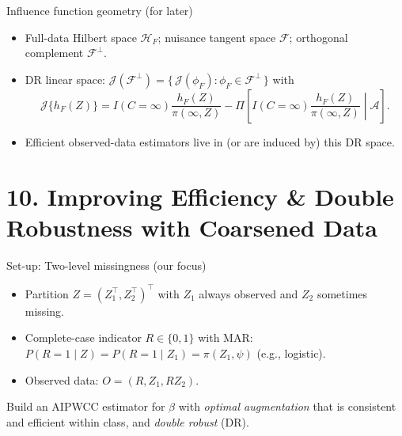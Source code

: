 \documentclass[xcolor=dvipsnames,aspectratio=169]{beamer}
\newcommand{\1}{\mathbbm{1}}
\begin{document}
\begin{frame}{Influence function geometry (for later)}
  \begin{itemize}
    \item Full-data Hilbert space $\mathcal{H}_F$; nuisance tangent space $\mathcal{F}$; orthogonal complement $\mathcal{F}^{\perp}$.
    \item DR linear space: $\mathcal{J}(\mathcal{F}^{\perp})=\{\,\mathcal{J}(\phi_F): \phi_F\in\mathcal{F}^{\perp}\,\}$ with
    \[
      \mathcal{J}\{h_F(Z)\}=I(C=\infty)\frac{h_F(Z)}{\pi(\infty,Z)}-\Pi\!\left[I(C=\infty)\frac{h_F(Z)}{\pi(\infty,Z)}\middle|\mathcal{A}\right].
    \]
    \item Efficient observed-data estimators live in (or are induced by) this DR space.
  \end{itemize}
\end{frame}

\section{10. Improving Efficiency \& Double Robustness with Coarsened Data}

\begin{frame}{Set-up: Two-level missingness (our focus)}
  \begin{itemize}
    \item Partition $Z=(Z_1^\top,Z_2^\top)^\top$ with $Z_1$ always observed and $Z_2$ sometimes missing.
    \item Complete-case indicator $R\in\{0,1\}$ with MAR: $P(R=1\mid Z)=P(R=1\mid Z_1)=\pi(Z_1,\psi)$ (e.g., logistic).
    \item Observed data: $O=(R, Z_1, RZ_2)$.
  \end{itemize}
  \vspace{4pt}
  \begin{tcolorbox}[title=Goal]
    Build an AIPWCC estimator for $\beta$ with \emph{optimal augmentation}
    that is consistent and efficient within class, and \emph{double robust} (DR).
  \end{tcolorbox}
\end{frame}
\end{document}
